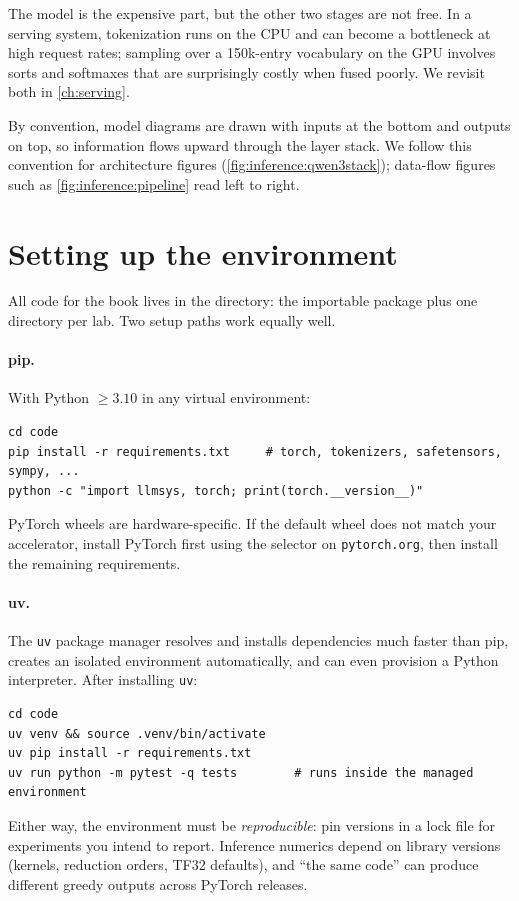The model is the expensive part, but the other two stages are not free. In a serving system,
tokenization runs on the CPU and can become a bottleneck at high request rates; sampling over a
150k-entry vocabulary on the GPU involves sorts and softmaxes that are surprisingly costly when
fused poorly. We revisit both in \cref{ch:serving}.

\begin{keyidea}
By convention, model diagrams are drawn with inputs at the bottom and outputs on top, so
information flows upward through the layer stack. We follow this convention for architecture
figures (\cref{fig:inference:qwen3stack}); data-flow figures such as \cref{fig:inference:pipeline}
read left to right.
\end{keyidea}

\section{Setting up the environment}\label{sec:inference:env}

All code for the book lives in the  directory: the importable package
 plus one directory per lab. Two setup paths work equally well.

\paragraph{pip.} With Python $\ge 3.10$ in any virtual environment:
\begin{lstlisting}[style=shell]
cd code
pip install -r requirements.txt     # torch, tokenizers, safetensors, sympy, ...
python -c "import llmsys, torch; print(torch.__version__)"
\end{lstlisting}
PyTorch wheels are hardware-specific. If the default wheel does not match your accelerator,
install PyTorch first using the selector on \texttt{pytorch.org}, then install the remaining
requirements.

\paragraph{uv.} The \texttt{uv} package manager resolves and installs dependencies much faster than pip,
creates an isolated environment automatically, and can even provision a Python interpreter.
After installing \texttt{uv}:
\begin{lstlisting}[style=shell]
cd code
uv venv && source .venv/bin/activate
uv pip install -r requirements.txt
uv run python -m pytest -q tests        # runs inside the managed environment
\end{lstlisting}
Either way, the environment must be \emph{reproducible}: pin versions in a lock file for
experiments you intend to report. Inference numerics depend on library versions (kernels,
reduction orders, TF32 defaults), and ``the same code'' can produce different greedy outputs
across PyTorch releases.

